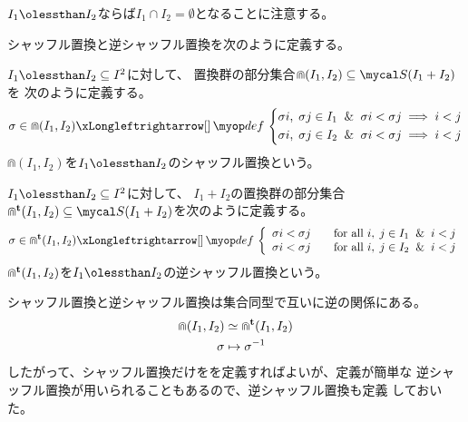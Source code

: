 {	$I_1\oless I_2$ならば$I_1\cap I_2=\emptyset$となることに注意する。

	シャッフル置換と逆シャッフル置換を次のように定義する。

	\begin{definition}[シャッフル置換]\label{def:シャッフル置換} %
		$I_1\oless I_2\subseteq I^2$に対して、
		置換群の部分集合$\Cap(I_1,I_2)\subseteq\Perm(I_1+I_2)$を
		次のように定義する。
		\begin{equation*}\begin{split}
			\sigma\in \Cap(I_1,I_2) \xiff{\dfn} \left\{\begin{split}{}
				\sigma i,\;\sigma j \in I_1 \And \sigma i < \sigma j
					&\implies i < j \\
				\sigma i,\;\sigma j \in I_2 \And \sigma i < \sigma j
					&\implies i < j \\
			\end{split}\right.
		\end{split}\end{equation*}
		$\Cap(I_1,I_2)$を$I_1\oless I_2$のシャッフル置換という。
	\end{definition} %
	\begin{definition}[逆シャッフル置換]\label{def:逆シャッフル置換} %
		$I_1\oless I_2\subseteq I^2$に対して、
		$I_1+I_2$の置換群の部分集合
		$\Cap^\tran(I_1,I_2)\subseteq\Perm(I_1+I_2)$を次のように定義する。
		\begin{equation*}\begin{split}
			\sigma\in\Cap^\tran(I_1,I_2) \xiff{\dfn} \left\{\begin{array}{ll}
				\sigma i < \sigma j
				& \quad\text{for all } i,\;j \in I_1 \And i < j \\
				\sigma i < \sigma j
				& \quad\text{for all } i,\;j \in I_2 \And i < j \\
			\end{array}\right. \\ %
		\end{split}\end{equation*}
		$\Cap^{\mathbf{t}}(I_1,I_2)$を$I_1\oless I_2$の逆シャッフル置換という。
	\end{definition} %

	シャッフル置換と逆シャッフル置換は集合同型で互いに逆の関係にある。
	\begin{equation*}\begin{split}
		\Cap(I_1,I_2) &\simeq \Cap^{\mathbf{t}}(I_1,I_2) \\
		\sigma &\mapsto \sigma^{-1}
	\end{split}\end{equation*}
	したがって、シャッフル置換だけをを定義すればよいが、定義が簡単な
	逆シャッフル置換が用いられることもあるので、逆シャッフル置換も定義
	しておいた。

}
